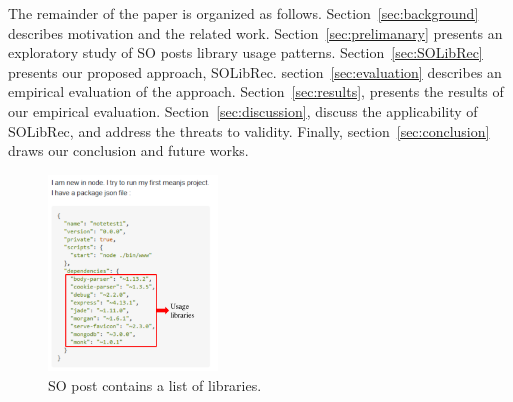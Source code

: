 \documentclass[paper]{ieice}
\begin{document}
The remainder of the paper is organized as follows. 
Section~\ref{sec:background} describes motivation and the related work. Section~\ref{sec:prelimanary} presents an exploratory study of SO posts library usage patterns. Section~\ref{sec:SOLibRec} presents our proposed approach, SOLibRec. 
section~\ref{sec:evaluation} describes an empirical evaluation of the approach. Section~\ref{sec:results}, presents the results of our empirical evaluation. Section~\ref{sec:discussion}, discuss the applicability of SOLibRec, and address the threats to validity. Finally, section~\ref{sec:conclusion} draws our conclusion and future works.

\begin{figure}[ht]
	\centering
	\includegraphics[width=0.4\textwidth]{example_4.pdf}
	\caption{SO post contains a list of libraries.} 
	\label{fig:example}
\end{figure} 


\end{document}
